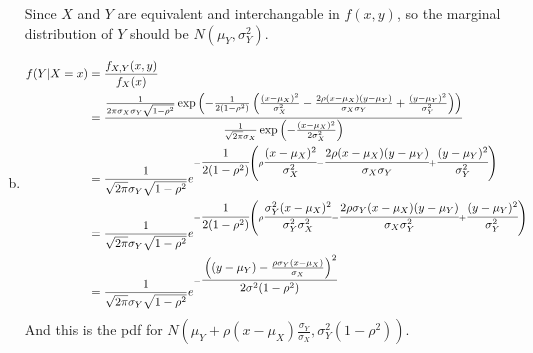 \documentclass[letterpaper]{article}
\begin{document}
\begin{enumerate}[(a)]
    Since $X$ and $Y$ are equivalent and interchangable in $f(x,y)$, so the marginal distribution of $Y$ should be $N(\mu_Y, \sigma^2_Y)$.
    \item 
    \begin{align*}
    f(Y|X=x) & = \frac{f_{X,Y}(x,y)}{f_X(x)} \\
    & = \cfrac{\frac{1}{2\pi\sigma_X\sigma_Y \sqrt{1-\rho^2}} \exp\left(-\frac{1}{2(1-\rho^2)} \left(\frac{(x-\mu_X)^2}{\sigma_X^2} - \frac{2\rho(x-\mu_X)(y-\mu_Y)}{\sigma_X \sigma_Y} + \frac{(y-\mu_Y)^2}{\sigma_Y^2}\right) \right)}{\frac{1}{\sqrt{2\pi}\sigma_X}\exp\left(-\frac{(x-\mu_X)^2}{2\sigma_X^2}\right)} \\
    & = \frac{1}{\sqrt{2\pi}\sigma_Y\sqrt{1-\rho^2}} e^{-\cfrac{1}{2(1-\rho^2)} \left(\rho \cfrac{(x-\mu_X)^2}{\sigma_X^2} - \cfrac{2\rho(x - \mu_X)(y - \mu_Y)}{\sigma_X \sigma_Y} + \cfrac{(y-\mu_Y)^2}{\sigma_Y^2}\right)} \\
    & = \frac{1}{\sqrt{2\pi}\sigma_Y\sqrt{1-\rho^2}} e^{-\cfrac{1}{2(1-\rho^2)} \left(\rho \cfrac{\sigma_Y^2(x-\mu_X)^2}{\sigma_Y^2\sigma_X^2} - \cfrac{2\rho\sigma_Y(x - \mu_X)(y - \mu_Y)}{\sigma_X \sigma_Y^2} + \cfrac{(y-\mu_Y)^2}{\sigma_Y^2}\right)} \\
    & = \frac{1}{\sqrt{2\pi}\sigma_Y\sqrt{1-\rho^2}} e^{-\cfrac{\left((y-\mu_Y) - \frac{\rho\sigma_Y (x-\mu_X)}{\sigma_X}\right)^2}{2\sigma^2(1-\rho^2)}}
    \end{align*}
    And this is the pdf for $N(\mu_Y + \rho(x-\mu_X)\frac{\sigma_Y}{\sigma_X}, \sigma^2_Y(1-\rho^2))$.
    \end{enumerate}
\end{document}

